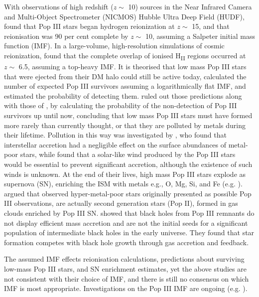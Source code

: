 \documentclass[11pt]{article}
\begin{document}
With observations of high redshift ($z \sim$ 10) sources in the Near Infrared Camera and Multi-Object Spectrometer (NICMOS) Hubble Ultra Deep Field (HUDF), \cite{Choudhury2006} found that Pop III stars began hydrogen reionization at $z \sim$ 15, and that reionisation was 90 per cent complete by $z \sim$ 10, assuming a Salpeter initial mass function (IMF). In a large-volume, high-resolution simulations of cosmic reionization, \citet{Trac2007} found that the complete overlap of ionised H\textsubscript{II} regions occurred at $z \sim$ 6.5, assuming a top-heavy IMF. It is theorised that low mass Pop III stars that were ejected from their DM halo could still be active today, \cite{Hartwig2015} calculated the number of expected  Pop III survivors assuming a logarithmically flat IMF, and estimated the probability of detecting them. \cite{Magg2019} ruled out those predictions along with those of \cite{Ishiyama2016}, by calculating the probability of the non-detection  of Pop III survivors up until now, concluding that low mass Pop III stars must have formed more rarely than currently thought, or that they are polluted by metals during their lifetime. Pollution in this way was investigated by \cite{Frebel2009}, who found that interstellar accretion had a negligible effect on the surface abundances of metal-poor stars, while \cite{Johnson2011} found that a solar-like wind produced by the Pop III stars would be essential to prevent significant accretion, although the existence of such winds is unknown. At the end of their lives, high mass Pop III stars explode as supernova (SN), enriching the ISM with metals e.g., O, Mg, Si, and Fe (e.g. \citealt{Tominaga2007}). \cite{Iwamoto2005} argued that observed hyper-metal-poor stars originally presented as possible Pop III observations, are actually second generation stars (Pop II), formed in gas clouds enriched by Pop III SN. \cite{Smith2018} showed that black holes from Pop III remnants do not display efficient mass accretion and are not the initial seeds for a significant population of intermediate black holes in the early universe. They found that star formation competes with black hole growth through gas accretion and feedback. 

The assumed IMF effects reionisation calculations, predictions about surviving low-mass Pop III stars, and SN enrichment estimates, yet the above studies are not consistent with their choice of IMF, and there is still no consensus on which IMF is most appropriate. Investigations on the Pop III IMF are ongoing (e.g. \citealt{Ma2017a}).
\end{document}
